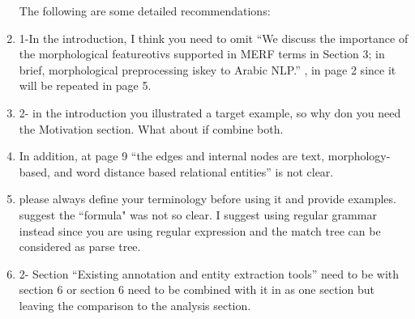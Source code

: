 \begin{enumerate}[leftmargin=0mm,label=\bfseries CommentR3.\arabic*]
The following are some detailed recommendations:

\item \label{Review.3.5}
1-In the introduction, I think you need to omit 
    ``We discuss the importance of the morphological featureotivs supported in 
    MERF terms in Section 3; in brief, morphological preprocessing iskey to 
    Arabic NLP.'' , in page 2 since it will be repeated in page 5.


\item \label{Review.3.6}
2- in the introduction you illustrated a target example, 
so why don you need the Motivation section. 
What about if combine both.



\item \label{Review.3.7}
In addition, at page 9 ``the edges and internal nodes are text, 
morphology-based, and word distance based relational entities'' 
is not clear.



\item \label{Review.3.8}
please always define your terminology before using it and 
provide examples. suggest the ``formula" was not so clear. 
I suggest using regular grammar instead since you are using 
regular expression and the match tree can be considered as 
parse tree.



\item \label{Review.3.9}
2- Section ``Existing annotation and entity extraction tools” 
need to be with section 6 or section 6 need to be combined 
with it in as one section but leaving the comparison to 
the analysis section.


\end{enumerate}
